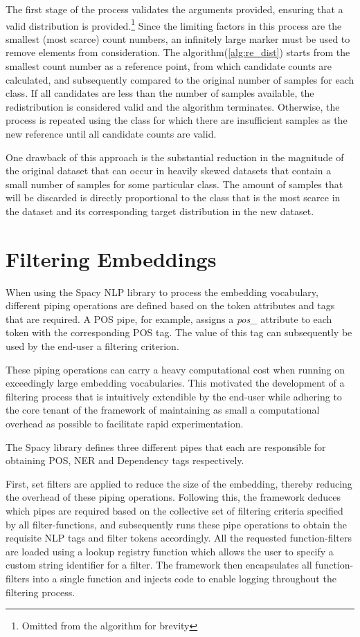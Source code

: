 \documentclass[12pt, a4paper]{report}
\theoremstyle{definition}
\theoremstyle{definition}%
\theoremstyle{definition}%
\theoremstyle{definition}%
\theoremstyle{definition}%
\theoremstyle{definition}%
\begin{document}
The first stage of the process validates the arguments provided, ensuring that a valid distribution is provided.\footnote{Omitted from the algorithm for brevity} Since the limiting factors in this process are the smallest (most scarce) count numbers, an infinitely large marker must be used to remove elements from consideration. The algorithm(\ref{alg:re_dist}) starts from the smallest count number as a reference point, from which candidate counts are calculated, and subsequently compared to the original number of samples for each class. If all candidates are less than the number of samples available, the redistribution is considered valid and the algorithm terminates. Otherwise, the process is repeated using the class for which there are insufficient samples as the new reference until all candidate counts are valid.

One drawback of this approach is the substantial reduction in the magnitude of the original dataset that can occur in heavily skewed datasets that contain a small number of samples for some particular class. The amount of samples that will be discarded is directly proportional to the class that is the most scarce in the dataset and its corresponding target distribution in the new dataset.

\section{Filtering Embeddings} \label{sec:filtering_embeddings}
When using the Spacy NLP library to process the embedding vocabulary, different piping operations are defined based on the token attributes and tags that are required. A POS pipe, for example, assigns a \textit{pos\_} attribute to each token with the corresponding POS tag. The value of this tag can subsequently be used by the end-user a filtering criterion.

These piping operations can carry a heavy computational cost when running on exceedingly large embedding vocabularies. This motivated the development of a filtering process that is intuitively extendible by the end-user while adhering to the core tenant of the framework of maintaining as small a computational overhead as possible to facilitate rapid experimentation.

The Spacy library defines three different pipes that each are responsible for obtaining POS, NER and Dependency tags respectively.

First, set filters are applied to reduce the size of the embedding, thereby reducing the overhead of these piping operations. Following this, the framework deduces which pipes are required based on the collective set of filtering criteria specified by all filter-functions, and subsequently runs these pipe operations to obtain the requisite NLP tags and filter tokens accordingly. All the requested function-filters are loaded using a lookup registry function which allows the user to specify a custom string identifier for a filter. The framework then encapsulates all function-filters into a single function and injects code to enable logging throughout the filtering process.
\end{document}
